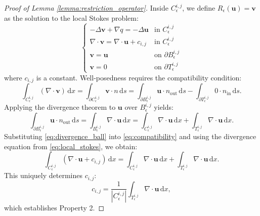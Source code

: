 \documentclass{elsarticle}
\begin{document}
\begin{proof}[Proof of Lemma \ref{lemma:restriction_operator}]
    Inside $C_{\epsilon}^{i,j}$, we define $R_{\epsilon}(\mathbf{u}) = \mathbf{v}$ as the solution to the local Stokes problem:
    \begin{equation} \label{eq:local_stokes}
        \begin{cases}
            -\Delta \mathbf{v} + \nabla q = -\Delta \mathbf{u}          & \text{in } C_{\epsilon}^{i,j}          \\
            \nabla \cdot \mathbf{v} = \nabla \cdot \mathbf{u} + c_{i,j} & \text{in } C_{\epsilon}^{i,j}          \\
            \mathbf{v} = \mathbf{u}                                     & \text{on } \partial B_{\epsilon}^{i,j} \\
            \mathbf{v} = 0                                              & \text{on } \partial T_{\epsilon}^{i,j}
        \end{cases}
    \end{equation}
    where $c_{i,j}$ is a constant. Well-posedness requires the compatibility condition:
    \begin{equation} \label{eq:compatibility}
        \int_{C_{\epsilon}^{i,j}} (\nabla \cdot \mathbf{v}) \, \mathrm{d}x = \int_{\partial C_{\epsilon}^{i,j}} \mathbf{v} \cdot n \, \mathrm{d}s = \int_{\partial B_{\epsilon}^{i,j}} \mathbf{u} \cdot n_{\mathrm{out}} \, \mathrm{d}s - \int_{\partial T_{\epsilon}^{i,j}} 0 \cdot n_{\mathrm{in}} \, \mathrm{d}s.
    \end{equation}
    Applying the divergence theorem to $\mathbf{u}$ over $B_{\epsilon}^{i,j}$ yields:
    \begin{equation} \label{eq:divergence_ball}
        \int_{\partial B_{\epsilon}^{i,j}} \mathbf{u} \cdot n_{\mathrm{out}} \, \mathrm{d}s = \int_{B_{\epsilon}^{i,j}} \nabla \cdot \mathbf{u} \, \mathrm{d}x = \int_{C_{\epsilon}^{i,j}} \nabla \cdot \mathbf{u} \, \mathrm{d}x + \int_{T_{\epsilon}^{i,j}} \nabla \cdot \mathbf{u} \, \mathrm{d}x.
    \end{equation}
    Substituting \eqref{eq:divergence_ball} into \eqref{eq:compatibility} and using the divergence equation from \eqref{eq:local_stokes}, we obtain:
    \begin{equation}
        \int_{C_{\epsilon}^{i,j}} (\nabla \cdot \mathbf{u} + c_{i,j}) \, \mathrm{d}x = \int_{C_{\epsilon}^{i,j}} \nabla \cdot \mathbf{u} \, \mathrm{d}x + \int_{T_{\epsilon}^{i,j}} \nabla \cdot \mathbf{u} \, \mathrm{d}x.
    \end{equation}
    This uniquely determines $c_{i,j}$:
    \begin{equation}
        c_{i,j} = \frac{1}{|C_{\epsilon}^{i,j}|} \int_{T_{\epsilon}^{i,j}} \nabla \cdot \mathbf{u} \, \mathrm{d}x,
    \end{equation}
    which establishes Property 2.


\end{proof}
\end{document}
